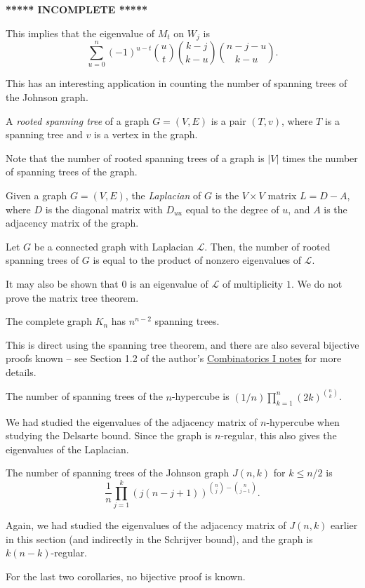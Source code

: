 	\textbf{***** INCOMPLETE *****}

	This implies that the eigenvalue of $M_t$ on $W_j$ is
	\[ \sum_{u=0}^n (-1)^{u-t} \binom{u}{t} \binom{k-j}{k-u} \binom{n-j-u}{k-u}. \]

	This has an interesting application in counting the number of spanning trees of the Johnson graph.

	\begin{definition}
		A \emph{rooted spanning tree} of a graph $G=(V,E)$ is a pair $(T,v)$, where $T$ is a spanning tree and $v$ is a vertex in the graph.
	\end{definition}
	Note that the number of rooted spanning trees of a graph is $|V|$ times the number of spanning trees of the graph.

	\begin{fdef}
		Given a graph $G=(V,E)$, the \emph{Laplacian} of $G$ is the $V \times V$ matrix $L = D-A$, where $D$ is the diagonal matrix with $D_{uu}$ equal to the degree of $u$, and $A$ is the adjacency matrix of the graph.
	\end{fdef}

	\begin{ftheo}
		Let $G$ be a connected graph with Laplacian $\mathcal{L}$. Then, the number of rooted spanning trees of $G$ is equal to the product of nonzero eigenvalues of $\mathcal{L}$.
	\end{ftheo}
	It may also be shown that $0$ is an eigenvalue of $\mathcal{L}$ of multiplicity $1$. We do not prove the matrix tree theorem.

	\begin{fcor}
		The complete graph $K_n$ has $n^{n-2}$ spanning trees.
	\end{fcor}
	This is direct using the spanning tree theorem, and there are also several bijective proofs known -- see Section 1.2 of the author's \href{https://amitrajaraman.github.io/notes/ma-861/}{Combinatorics I notes} for more details.

	\begin{fcor}
		The number of spanning trees of the $n$-hypercube is $(1/n) \prod_{k=1}^{n} (2k)^{\binom{n}{k}}$.
	\end{fcor}
	We had studied the eigenvalues of the adjacency matrix of $n$-hypercube when studying the Delsarte bound. Since the graph is $n$-regular, this also gives the eigenvalues of the Laplacian.

	\begin{fcor}
		The number of spanning trees of the Johnson graph $J(n,k)$ for $k \le n/2$ is
		\[ \frac{1}{n} \prod_{j=1}^{k} (j(n-j+1))^{\binom{n}{j} - \binom{n}{j-1}}. \]
	\end{fcor}
	Again, we had studied the eigenvalues of the adjacency matrix of $J(n,k)$ earlier in this section (and indirectly in the Schrijver bound), and the graph is $k(n-k)$-regular.

	For the last two corollaries, no bijective proof is known.